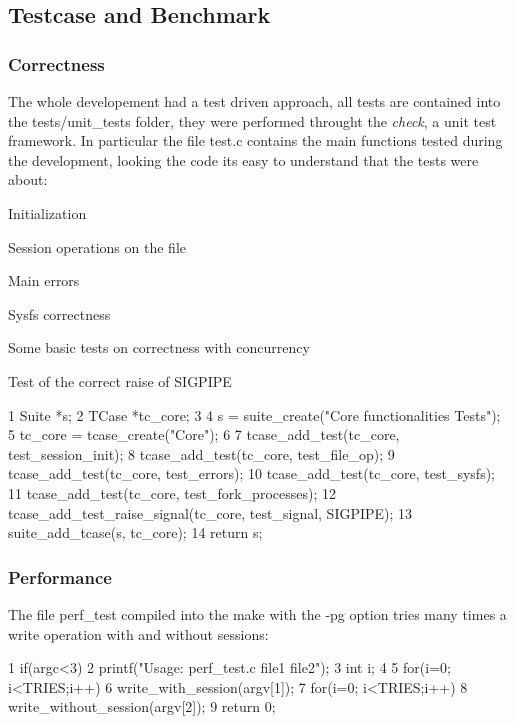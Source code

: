 \subsection*{Testcase and Benchmark}

\subsubsection*{Correctness}

The whole developement had a test driven approach, all tests are contained into the tests/unit\+\_\+tests folder, they were performed throught the {\itshape check}, a unit test framework. In particular the file test.\+c contains the main functions tested during the development, looking the code it\textquotesingle{}s easy to understand that the tests were about\+:
\begin{DoxyItemize}
\item Initialization
\item Session operations on the file
\item Main errors
\item Sysfs correctness
\item Some basic tests on correctness with concurrency
\item Test of the correct raise of S\+I\+G\+P\+I\+PE
\end{DoxyItemize}


\begin{DoxyCode}
1 Suite *s;
2     TCase *tc\_core;
3 
4     s = suite\_create("Core functionalities Tests");
5     tc\_core = tcase\_create("Core");
6 
7     tcase\_add\_test(tc\_core, test\_session\_init);
8     tcase\_add\_test(tc\_core, test\_file\_op);
9     tcase\_add\_test(tc\_core, test\_errors);
10     tcase\_add\_test(tc\_core, test\_sysfs);
11     tcase\_add\_test(tc\_core, test\_fork\_processes);
12     tcase\_add\_test\_raise\_signal(tc\_core, test\_signal, SIGPIPE);
13     suite\_add\_tcase(s, tc\_core);
14     return s;
\end{DoxyCode}
 \subsubsection*{Performance}

The file perf\+\_\+test compiled into the make with the -\/pg option tries many times a write operation with and without sessions\+: 
\begin{DoxyCode}
1 if(argc<3)
2     printf("Usage: perf\_test.c file1 file2");
3 int i;
4 
5 for(i=0; i<TRIES;i++)
6     write\_with\_session(argv[1]);
7 for(i=0; i<TRIES;i++)
8     write\_without\_session(argv[2]);
9 return 0;
\end{DoxyCode}


